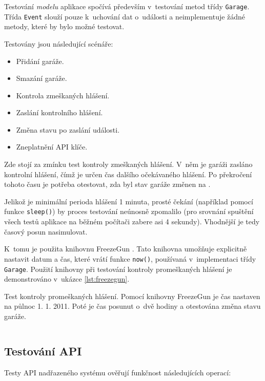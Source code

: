 Testování \textit{modelu} aplikace spočívá především v~testování metod třídy \texttt{Garage}. Třída \texttt{Event} slouží pouze k~uchování dat o~události a neimplementuje žádné metody, které by bylo možné testovat.

Testovány jsou následující scénáře:

\begin{itemize}
    \item Přidání garáže.
    \item Smazání garáže.
    \item Kontrola zmeškaných hlášení.
    \item Zaslání kontrolního hlášení.
    \item Změna stavu po zaslání události.
    \item Zneplatnění API klíče.
\end{itemize}

Zde stojí za zmínku test kontroly zmeškaných hlášení. V~něm je garáži zasláno kontrolní hlášení, čímž je určen čas dalšího očekávaného hlášení. Po překročení tohoto času je potřeba otestovat, zda byl stav garáže změnen na .

Jelikož je minimální perioda hlášení 1 minuta, prosté čekání (například pomocí funkce \texttt{sleep()}) by proces testování neúnosně zpomalilo (pro srovnání spuštění všech testů aplikace na běžném počítači zabere asi 4 sekundy). Vhodnější je tedy časový posun nasimulovat.

K~tomu je použita knihovnu FreezeGun \cite{freezegun}. Tato knihovna umožňuje explicitně nastavit datum a čas, které vrátí funkce \texttt{now()}, používaná v~implementaci třídy \texttt{Garage}. Použití knihovny při testování kontroly promeškaných hlášení je demonstrováno v~ukázce \ref{lst:freezegun}.

\begin{listing}[htbp]
\caption{\label{lst:freezegun} Test kontroly promeškaných hlášení. Pomocí knihovny FreezeGun je čas nastaven na půlnoc 1. 1. 2011. Poté je čas posunut o~dvě hodiny a otestována změna stavu garáže.}
\inputminted[bgcolor=codebg]{python}{source-samples/freezegun.py}
\end{listing}

\subsection{Testování API}

Testy API nadřazeného systému ověřují funkčnost následujících operací:


